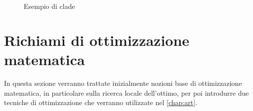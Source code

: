 \begin{figure}[!h]
    \centering
    \caption{Esempio di clade}
    \label{fig:intro-clade}
\end{figure}

\section{Richiami di ottimizzazione matematica}
\label{chap:intro-optim}
In questa sezione verranno trattate inizialmente nozioni base di ottimizzazione matematica, in particolare sulla ricerca locale dell'ottimo, per poi introdurre due tecniche di ottimizzazione che verranno utilizzate nel \autoref{chap:art}.

